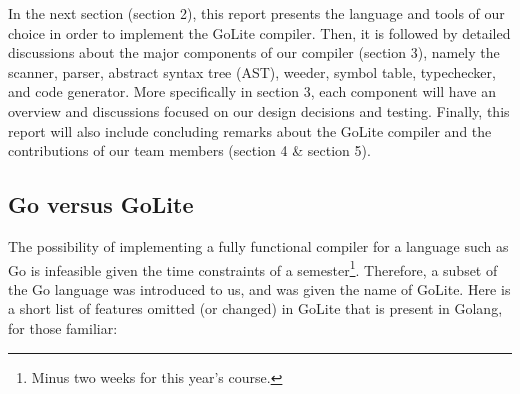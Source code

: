 \documentclass{article}
\begin{document}
In the next section (section 2), this report presents the language and tools of our choice in order to implement the GoLite compiler. Then, it is followed by detailed discussions about the major components of our compiler (section 3), namely the scanner, parser, abstract syntax tree (AST), weeder, symbol table, typechecker, and code generator. More specifically in section 3, each component will have an overview and discussions focused on our design decisions and testing. Finally, this report will also include concluding remarks about the GoLite compiler and the contributions of our team members (section 4 \& section 5).


\subsection{Go versus GoLite}

The possibility of implementing a fully functional compiler for a language such as Go is infeasible given the time constraints of a semester\footnote{Minus two weeks for this year's course.}. Therefore, a subset of the Go language was introduced to us, and was given the name of GoLite. Here is a short list of features omitted (or changed) in GoLite that is present in Golang, for those familiar:
\end{document}
